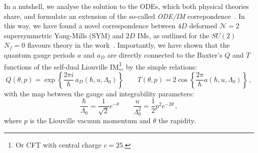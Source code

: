\documentclass[11pt,a4paper]{elsarticle}
\def \th {\theta}
\def \L {\Lambda}
\newcommand{\be}{\begin{equation}}
\newcommand{\ee}{\end{equation}}
\def\th{\theta}
\def \L {\Lambda}
\numberwithin{figure}{section}
\numberwithin{table}{section}
\begin{document}
In a nutshell, we analyse the solution to the ODEs, which both physical theories share, and formulate an extension of the so-called \textit{ODE/IM} correpondence~\cite{DoreyTateo1998,BazhanovLukyanovZamolodchikov2001}. In this way, we have found a novel correspondence between $4D$ deformed $\mathcal{N}=2$ supersymmetric Yang-Mills (SYM) and $2D$ IMs, as outlined for the $SU(2)$ $N_f=0$ flavours theory in the work~\cite{FioravantiGregori:2019}. Importantly, we have shown that the quantum gauge periods $a$ and $a_D$ are directly connected to the Baxter's $Q$ and $T$ functions of the self-dual Liouville IM\footnote{Or CFT with central charge $c=25$.}, by the simple relations:
\be  \label{QTcycles0}
Q(\th,p) = \exp  \left\{\frac{2 \pi i }{\hbar}\,a_D(\hbar ,u,\L_0)  \right\} \qquad T(\th,p) = 2 \cos \left\{\frac{2 \pi }{\hbar}a(\hbar,u,\Lambda_0)\right\}\,,
\ee 
with the map between the gauge and integrability parameters:
\be 
\frac{\hbar}{\Lambda_0}=\frac{1}{\sqrt{2}} e^{-\theta} \qquad \frac{u}{\Lambda_0^2} =\frac{1}{2} p^2 e^{-2\theta} \,,
\label{gau-int-map}
\ee 
where $p$ is the Liouville vacuum momentum and $\theta$ the rapidity.
\end{document}
